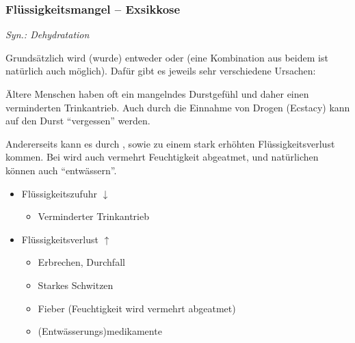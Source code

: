 






\subsubsection{Flüssigkeitsmangel -- Exsikkose}

\emph{Syn.: Dehydratation}


Grundsätzlich wird (wurde) entweder 
oder  (eine Kombination aus
beidem ist natürlich auch möglich). Dafür gibt es jeweils sehr verschiedene Ursachen: 

{
Ältere Menschen haben oft ein mangelndes Durstgefühl und daher
einen verminderten Trinkantrieb. Auch durch die Einnahme von
Drogen (Ecstacy) kann auf den Durst "`vergessen"' werden.  

Andererseits kann es durch , 
sowie  zu einem stark erhöhten
Flüssigkeitsverlust kommen. Bei  wird auch
vermehrt Feuchtigkeit abgeatmet, und natürlichen können
auch  "`entwässern"'.
}{
\begin{itemize} %
  \item Flüssigkeitszufuhr ${\downarrow}$
  \begin{itemize}
    \item Verminderter Trinkantrieb
  \end{itemize}
  \item Flüssigkeitsverlust ${\uparrow}$
  \begin{itemize}
    \item Erbrechen, Durchfall
    \item Starkes Schwitzen
    \item Fieber (Feuchtigkeit wird vermehrt abgeatmet)
    \item (Entwässerungs)medikamente
  \end{itemize}
\end{itemize}
}{}{}{}

